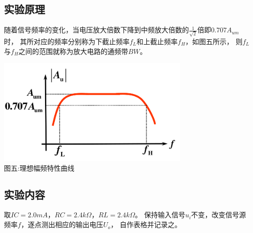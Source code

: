 \documentclass[a4paper]{article}
\begin{document}
    \subsection{实验原理}\label{subsec:13}
    {{随着信号频率的变化，当电压放大倍数下降到中频放大倍数的$\frac{1}{\sqrt{2}}$倍即$0.707A_{um}$时，
    其所对应的频率分别称为下截止频率$f_L$和上截止频率$f_H$，如图五所示，
    则$f_L$与$f_H$之间的范围就称为放大电路的通频带$BW$。}}
    \begin{center}
        \includegraphics[height=150pt]{Af}\\
        {\small 图五:理想幅频特性曲线}
    \end{center}

    \subsection{实验内容}\label{subsec:14}
    {{取$IC=2.0mA$，$RC=2.4k\Omega$，$RL=2.4k\Omega$。
    保持输入信号$u_i$不变，改变信号源频率$f$，逐点测出相应的输出电压$U_o$，
    自作表格并记录之。}}
    \vspace{2.5cm}
\end{document}

